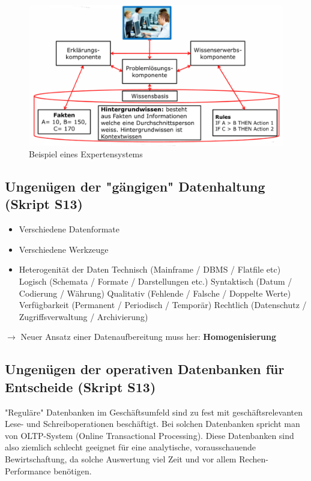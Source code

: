 \documentclass[a4paper, 11pt]{article}
\begin{document}
\begin{figure}[htb]
	\centering
	\includegraphics[keepaspectratio=true,height=15\baselineskip]{expertensystem.png}
	\caption{Beispiel eines Expertensystems}
	\label{fig:xps}
\end{figure}

\newpage

\subsection{Ungenügen der "gängigen" Datenhaltung (Skript S13)}

\begin{itemize}
	\item Verschiedene Datenformate
	\item Verschiedene Werkzeuge
	\item Heterogenität der Daten
		\subitem Technisch (Mainframe / DBMS / Flatfile etc)
		\subitem Logisch (Schemata / Formate / Darstellungen etc.)
		\subitem Syntaktisch (Datum / Codierung / Währung)
		\subitem Qualitativ (Fehlende / Falsche / Doppelte Werte)
		\subitem Verfügbarkeit (Permanent / Periodisch / Temporär)
		\subitem Rechtlich (Datenschutz / Zugriffsverwaltung / Archivierung)
\end{itemize}

$\longrightarrow$ Neuer Ansatz einer Datenaufbereitung muss her: \textbf{Homogenisierung}

\subsection{Ungenügen der operativen Datenbanken für Entscheide (Skript S13)}

"Reguläre" Datenbanken im Geschäftsumfeld sind zu fest mit geschäftsrelevanten Lese- und Schreiboperationen beschäftigt. Bei solchen Datenbanken spricht man von OLTP-System (Online Transactional Processing). Diese Datenbanken sind also ziemlich schlecht geeignet für eine analytische, vorausschauende Bewirtschaftung, da solche Auswertung viel Zeit und vor allem Rechen-Performance benötigen.
\end{document}
